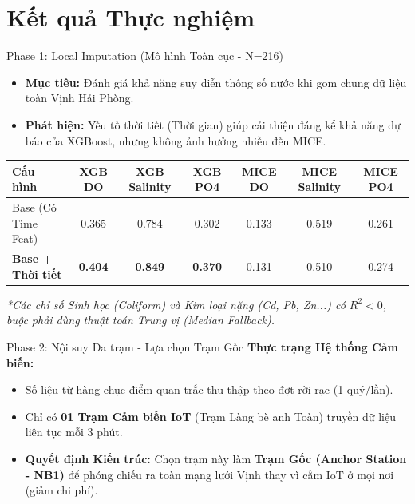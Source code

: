 \section{Kết quả Thực nghiệm}

\begin{frame}{Phase 1: Local Imputation (Mô hình Toàn cục - N=216)}
  \begin{itemize}
    \item \textbf{Mục tiêu:} Đánh giá khả năng suy diễn thông số nước khi gom chung dữ liệu toàn Vịnh Hải Phòng.
    \item \textbf{Phát hiện:} Yếu tố thời tiết (Thời gian) giúp cải thiện đáng kể khả năng dự báo của XGBoost, nhưng không ảnh hưởng nhiều đến MICE.
  \end{itemize}

  \vspace{0.3cm}
  \begin{table}[]
    \centering
    \small
    \begin{tabular}{lcccccc}
        \toprule
        \textbf{Cấu hình} & \textbf{XGB DO} & \textbf{XGB Salinity} & \textbf{XGB PO4} & \textbf{MICE DO} & \textbf{MICE Salinity} & \textbf{MICE PO4} \\ \midrule
        Base (Có Time Feat) & 0.365 & 0.784 & 0.302 & 0.133 & 0.519 & 0.261 \\
        \rowcolor{green!10}
        \textbf{Base + Thời tiết} & \textbf{0.404} & \textbf{0.849} & \textbf{0.370} & 0.131 & 0.510 & 0.274 \\ \bottomrule
    \end{tabular}
  \end{table}

  \vspace{0.2cm}
  \textit{*Các chỉ số Sinh học (Coliform) và Kim loại nặng (Cd, Pb, Zn...) có $R^2 < 0$, buộc phải dùng thuật toán Trung vị (Median Fallback).}
\end{frame}

\begin{frame}{Phase 2: Nội suy Đa trạm - Lựa chọn Trạm Gốc}
    \textbf{Thực trạng Hệ thống Cảm biến:}
    \begin{itemize}
        \item Số liệu từ hàng chục điểm quan trắc thu thập theo đợt rời rạc (1 quý/lần).
        \item Chỉ có \textbf{01 Trạm Cảm biến IoT} (Trạm Làng bè anh Toàn) truyền dữ liệu liên tục mỗi 3 phút.
        \item \textbf{Quyết định Kiến trúc:} Chọn trạm này làm \textbf{Trạm Gốc (Anchor Station - NB1)} để phóng chiếu ra toàn mạng lưới Vịnh thay vì cắm IoT ở mọi nơi (giảm chi phí).
    \end{itemize}
\end{frame}

